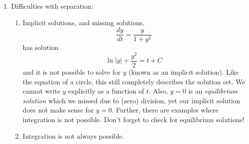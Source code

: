 \documentclass{article}
\begin{document}
\begin{enumerate}
\begin{enumerate}
\item Logistic growth: Another autonomous equation.
\[
\frac{dP}{dt} = k P\left( 1-\frac{P}{N} \right)
\]
Let's simplify things and take $k=1$, $N=1$. 
\[
\frac{dP}{dt} = P\left( 1-P \right) = f(P)
\]
Again we are separable, but note the right hand side only depends on $P$. This is called an \emph{autonomous} equation. We solve the same way. Note the equilibrium solutions $P=0,1$ as we divide.
\begin{align*}
\frac{dP}{dt} &= P\left( 1-P \right) \\
\int \frac{1}{P(1-P)} ~dP &= \int ~dt \\
\int \frac{1}{P} + \frac{1}{1-P} ~dP &= \int ~dt \\
\ln|P|-\ln|1-P| &= t+\hat{C} \\
\ln\left|\frac{P}{1-P}\right| &= t+\hat{C} \\
\frac{P}{1-P} &= e^{t+\hat{C}} \\
\frac{P}{1-P} &= Ce^{t} \\
P &= (1-P)Ce^{t} \\
P &= \frac{Ce^t}{Ce^t+1}  = \frac{1}{1+Ae^{-t}} 
\end{align*}
Note the use of partial fraction decomposition. For $A=1$ this is the sigmoid function (logistic curve). For the original equation with rate $k$ and carrying capacity $N$, we get
\[
P = \frac{NP_0e^{kt}}{N+P_0(e^{kt}-1)}.
\]
\end{enumerate}


\item Difficulties with separation:
\begin{enumerate}
\item Implicit solutions, and missing solutions.
\[
\frac{dy}{dt} = \frac{y}{1+y^2}
\]
has solution
\[
\ln|y| + \frac{y^2}{2} = t+C
\]
and it is not possible to solve for $y$ (known as an implicit solution). Like the equation of a circle, this still completely describes the solution set. We cannot write $y$ explicitly as a function of $t$. Also, $y=0$ is an \emph{equilibrium solution} which we missed due to (zero) division, yet our implicit solution does not make sense for $y=0$. Further, there are examples where integration is not possible. Don't forget to check for equilibrium solutions!

\item Integration is not always possible. 
\end{enumerate}


\end{enumerate}
\end{document}

